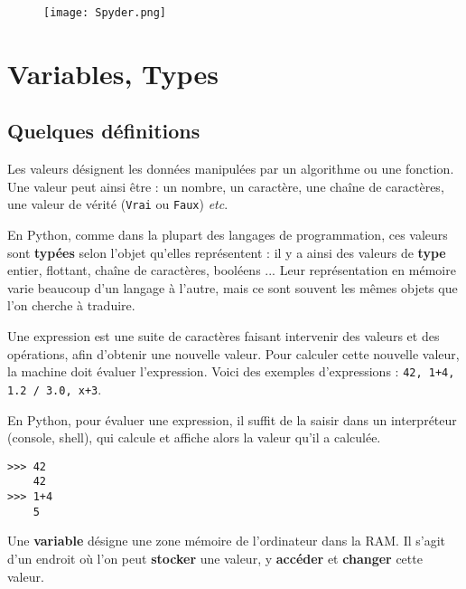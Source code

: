 \begin{figure}[H]
\centering
\texttt{[image: Spyder.png]}
\end{figure}

\section{Variables, Types}

\subsection{Quelques définitions}
\begin{defi}[Valeurs]
Les valeurs désignent les données manipulées par un algorithme ou une fonction. Une valeur 
peut ainsi être  : un nombre, un caractère, une chaîne de caractères, une valeur de vérité 
(\texttt{Vrai} ou \texttt{Faux}) \textit{etc}.

En Python, comme dans la plupart des langages de programmation, ces valeurs sont \textbf{typées} selon l'objet qu'elles représentent : il y a ainsi des valeurs de \textbf{type} entier, flottant, chaîne de caractères, booléens ...   Leur représentation en mémoire varie beaucoup d'un langage à l'autre, mais ce sont souvent les mêmes objets que l'on 
cherche à traduire.
\end{defi}

\begin{defi}[Expression]
Une expression est une suite de caractères faisant intervenir des valeurs et des 
opérations, afin d'obtenir une nouvelle valeur. Pour calculer cette nouvelle valeur,
la machine doit {évaluer} l'expression. Voici des exemples d'expressions : \texttt{42, 1+4, 
1.2 / 3.0, x+3}.
\end{defi}

En Python, pour évaluer une expression, il suffit de la saisir dans un interpréteur (console, shell), qui
calcule et affiche alors la valeur qu'il a calculée.
\begin{lstlisting}
>>> 42
	42
>>> 1+4
	5
\end{lstlisting}


\begin{defi}[Variable]
Une \textbf{variable} désigne une zone mémoire de l'ordinateur dans la RAM.
Il s'agit d'un endroit où l'on peut \textbf{stocker} une valeur, y \textbf{accéder} et 
\textbf{changer} cette valeur.
\end{defi}

